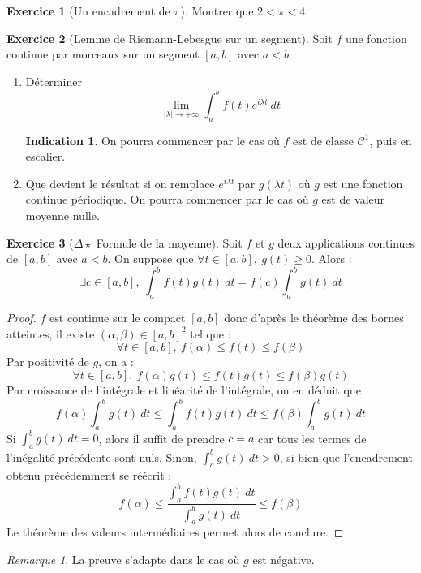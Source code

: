 \documentclass[french]{book}
\theoremstyle{definition}
\newtheorem{ex}{Exercice}[chapter]
\theoremstyle{theorem}
\newtheorem*{ind}{Indication}
\theoremstyle{remark}
\newtheorem*{rmq}{Remarque}
\begin{document}
\begin{ex}[Un encadrement de $\pi$]
	Montrer que $2<\pi<4$.
\end{ex}

\begin{ex}[Lemme de Riemann-Lebesgue sur un segment]
	Soit $f$ une fonction continue par morceaux sur un segment $[a,b]$ avec $a<b$.
	\begin{enumerate}
		\item Déterminer $$\lim_{\lvert\lambda\rvert\to+\infty}\int_{a}^{b}f(t)e^{i\lambda t}\ dt$$ \begin{ind}
			On pourra commencer par le cas où $f$ est de classe $\mathcal{C}^1$, puis en escalier.
		\end{ind}
		\item Que devient le résultat si on remplace $e^{i\lambda t}$ par $g(\lambda t)$ où $g$ est une fonction continue périodique. On pourra commencer par le cas où $g$ est de valeur moyenne nulle.
	\end{enumerate}
\end{ex}

\begin{ex}[$\Delta\star$ Formule de la moyenne]
	Soit $f$ et $g$ deux applications continues de $[a,b]$ avec $a<b$. On suppose que $\forall t\in[a,b],\ g(t)\geqslant0$. Alors : $$\exists c\in[a,b],\ \int_{a}^{b}f(t)g(t)\ dt=f(c)\int_{a}^{b}g(t)\ dt$$
\end{ex}

\begin{proof}
	$f$ est continue sur le compact $[a,b]$ donc d'après le théorème des bornes atteintes, il existe $(\alpha,\beta)\in[a,b]^2$ tel que : $$\forall t\in[a,b],\ f(\alpha)\leqslant f(t)\leqslant f(\beta)$$ Par positivité de $g$, on a : $$\forall t\in[a,b],\ f(\alpha)g(t)\leqslant f(t)g(t)\leqslant f(\beta)g(t)$$ Par croissance de l'intégrale et linéarité de l'intégrale, on en déduit que $$f(\alpha)\int_{a}^{b}g(t)\ dt \leqslant \int_{a}^{b}f(t)g(t)\ dt\leqslant f(\beta)\int_{a}^{b}g(t)\ dt$$ Si $\displaystyle \int_{a}^{b}g(t)\ dt=0$, alors il suffit de prendre $c=a$ car tous les termes de l'inégalité précédente sont nuls. Sinon, $\displaystyle \int_{a}^{b}g(t)\ dt >0$, si bien que l'encadrement obtenu précédemment se réécrit : $$f(\alpha)\leqslant\displaystyle\frac{\int_{a}^{b}f(t)g(t)\ dt}{\int_{a}^{b}g(t)\ dt}\leqslant f(\beta)$$ Le théorème des valeurs intermédiaires permet alors de conclure.
\end{proof}

\begin{rmq}
	La preuve s'adapte dans le cas où $g$ est négative.
\end{rmq}
\end{document}

